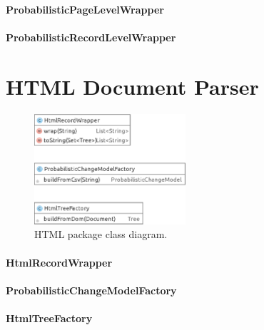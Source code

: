 

\paragraph{ProbabilisticPageLevelWrapper}

\paragraph{ProbabilisticRecordLevelWrapper}


\section{HTML Document Parser}


\begin{figure}[h]
	\centering
	\includegraphics[width=0.5\textwidth]{figures/package-html}
	\caption{HTML package class diagram.}
	\label{fig:package-html}
\end{figure}



\paragraph{HtmlRecordWrapper}

\paragraph{ProbabilisticChangeModelFactory}

\paragraph{HtmlTreeFactory}


